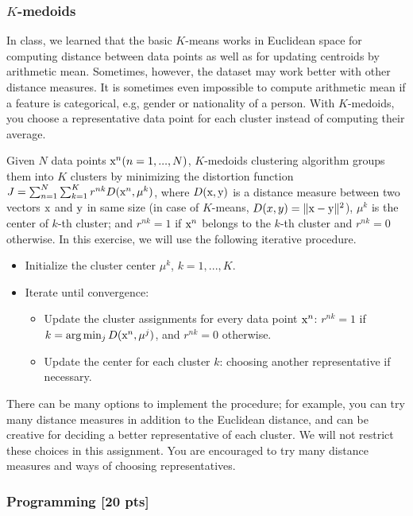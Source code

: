 \documentclass[11pt,epic]{article}
\begin{document}
\subsubsection*{$K$-medoids}

In class, we learned that the basic $K$-means works in Euclidean space for computing distance between data points as well as for updating centroids by arithmetic mean. Sometimes, however, the dataset may work better with other distance measures. It is sometimes even impossible to compute arithmetic mean if a feature is categorical, e.g, gender or nationality of a person. With $K$-medoids, you choose a representative data point for each cluster instead of computing their average.

Given $N$ data points $\text x^n (n = 1, ..., N)$, $K$-medoids clustering algorithm groups them into $K$ clusters by minimizing the distortion function $J = \sum_{n=1}^N \sum_{k=1}^K r^{nk} D(\text x^n, \mu^k)$,
where $D(\text x, \text y)$ is a distance measure between two vectors $\text x$ and $\text y$ in same size (in case of $K$-means, $D(x, y) = \| \text x - \text y \|^2$), $\mu^k$ is the center of $k$-th cluster; and $r^{nk} = 1$ if $\text x^n$ belongs to the $k$-th cluster and $r^{nk} = 0$ otherwise. In this exercise, we will use the following iterative procedure.

\begin{itemize}
  \item Initialize the cluster center $\mu^k$, $k = 1, ..., K$.
  \item Iterate until convergence: \begin{itemize}
    \item Update the cluster assignments for every data point $\text x^n$: $r^{nk} = 1$ if $k = \arg \min_j D(\text x^n, \mu^j)$, and $r^{nk} = 0$ otherwise.
    \item Update the center for each cluster $k$: choosing another representative if necessary.
  \end{itemize}
\end{itemize}

There can be many options to implement the procedure; for example, you can try many distance measures in addition to the Euclidean distance, and can be creative for deciding a better representative of each cluster. We will not restrict these choices in this assignment. You are encouraged to try many distance measures and ways of choosing representatives.


\subsubsection*{Programming [20 pts]}
\end{document}
